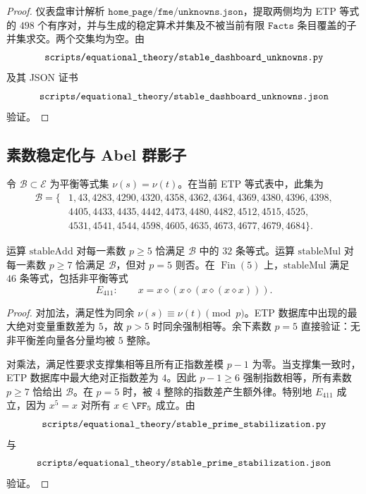 \documentclass[../../main.tex]{subfiles}
\begin{document}
\begin{proof}
仪表盘审计解析 \(\texttt{home\_page/fme/unknowns.json}\)，提取两侧均为 ETP 等式的 \(498\) 个有序对，并与生成的稳定算术并集及不被当前有限 \(\texttt{Facts}\) 条目覆盖的子并集求交。两个交集均为空。由
\[
    \texttt{\detokenize{scripts/equational_theory/stable_dashboard_unknowns.py}}
\]
及其 JSON 证书
\[
    \texttt{\detokenize{scripts/equational_theory/stable_dashboard_unknowns.json}}
\]
验证。
\end{proof}

\subsection{素数稳定化与 Abel 群影子}

令 \(\mathcal B\subset\mathcal E\) 为平衡等式集 \(\nu(s)=\nu(t)\)。在当前 ETP 等式表中，此集为
\[
\begin{aligned}
\mathcal B=\{&
1,43,4283,4290,4320,4358,4362,4364,4369,4380,4396,4398,\\
&4405,4433,4435,4442,4473,4480,4482,4512,4515,4525,\\
&4531,4541,4544,4598,4605,4635,4673,4677,4679,4684\}.
\end{aligned}
\]

\begin{theorem}[素数稳定化与 \(p=5\) 乘法例外]\label{thm:stable-audit-prime-stabilization}
运算 \(\mathrm{stableAdd}\) 对每一素数 \(p\geq 5\) 恰满足 \(\mathcal B\) 中的 \(32\) 条等式。运算 \(\mathrm{stableMul}\) 对每一素数 \(p\geq 7\) 恰满足 \(\mathcal B\)，但对 \(p=5\) 则否。在 \(\operatorname{Fin}(5)\) 上，\(\mathrm{stableMul}\) 满足 \(46\) 条等式，包括非平衡等式
\[
    E_{411}:\qquad x=x\diamond(x\diamond(x\diamond(x\diamond x))).
\]
\end{theorem}

\begin{proof}
对加法，满足性为同余 \(\nu(s)\equiv\nu(t)\pmod p\)。ETP 数据库中出现的最大绝对变量重数差为 \(5\)，故 \(p>5\) 时同余强制相等。余下素数 \(p=5\) 直接验证：无非平衡差向量各分量均被 \(5\) 整除。

对乘法，满足性要求支撑集相等且所有正指数差模 \(p-1\) 为零。当支撑集一致时，ETP 数据库中最大绝对正指数差为 \(4\)。因此 \(p-1\geq 6\) 强制指数相等，所有素数 \(p\geq 7\) 恰给出 \(\mathcal B\)。在 \(p=5\) 时，被 \(4\) 整除的指数差产生额外律。特别地 \(E_{411}\) 成立，因为 \(x^5=x\) 对所有 \(x\in\FF_5\) 成立。由
\[
    \texttt{\detokenize{scripts/equational_theory/stable_prime_stabilization.py}}
\]
与
\[
    \texttt{\detokenize{scripts/equational_theory/stable_prime_stabilization.json}}
\]
验证。
\end{proof}
\end{document}
